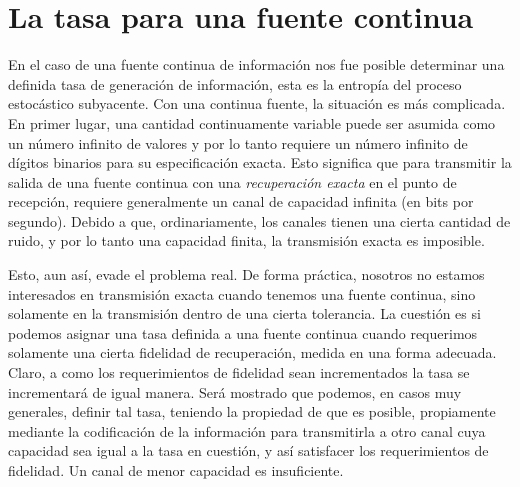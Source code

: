 \chapter{La tasa para una fuente continua}

En el caso de una fuente continua de informaci\'on nos fue posible
determinar una definida tasa de generaci\'on de informaci\'on, esta es
la entrop\'ia del proceso estoc\'astico subyacente. Con una continua
fuente, la situaci\'on es m\'as complicada.  En primer lugar, una
cantidad continuamente variable puede ser asumida como un n\'umero
infinito de valores y por lo tanto requiere un n\'umero infinito de
d\'igitos binarios para su especificaci\'on exacta. Esto significa que
para transmitir la salida de una fuente continua con una {\em
  recuperaci\'on exacta} en el punto de recepci\'on, requiere
generalmente un canal de capacidad infinita (en bits por
segundo). Debido a que, ordinariamente, los canales tienen una cierta
cantidad de ruido, y por lo tanto una capacidad finita, la
transmisi\'on exacta es imposible.

Esto, aun as\'i, evade el problema real. De forma pr\'actica, nosotros
no estamos interesados en transmisi\'on exacta cuando tenemos una
fuente continua, sino solamente en la transmisi\'on dentro de una
cierta tolerancia. La cuesti\'on es si podemos asignar una tasa
definida a una fuente continua cuando requerimos solamente una cierta
fidelidad de recuperaci\'on, medida en una forma adecuada.  Claro, a
como los requerimientos de fidelidad sean incrementados la tasa se
incrementar\'a de igual manera. Ser\'a mostrado que podemos, en casos
muy generales, definir tal tasa, teniendo la propiedad de que es
posible, propiamente mediante la codificaci\'on de la informaci\'on
para transmitirla a otro canal cuya capacidad sea igual a la tasa en
cuesti\'on, y as\'i satisfacer los requerimientos de fidelidad. Un
canal de menor capacidad es insuficiente.


